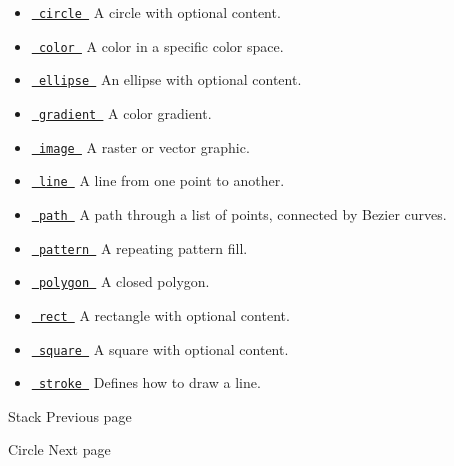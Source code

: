 \begin{itemize}
\tightlist
\item
  \href{/docs/reference/visualize/circle/}{\texttt{\ circle\ }} { A
  circle with optional content. }
\item
  \href{/docs/reference/visualize/color/}{\texttt{\ color\ }} { A color
  in a specific color space. }
\item
  \href{/docs/reference/visualize/ellipse/}{\texttt{\ ellipse\ }} { An
  ellipse with optional content. }
\item
  \href{/docs/reference/visualize/gradient/}{\texttt{\ gradient\ }} { A
  color gradient. }
\item
  \href{/docs/reference/visualize/image/}{\texttt{\ image\ }} { A raster
  or vector graphic. }
\item
  \href{/docs/reference/visualize/line/}{\texttt{\ line\ }} { A line
  from one point to another. }
\item
  \href{/docs/reference/visualize/path/}{\texttt{\ path\ }} { A path
  through a list of points, connected by Bezier curves. }
\item
  \href{/docs/reference/visualize/pattern/}{\texttt{\ pattern\ }} { A
  repeating pattern fill. }
\item
  \href{/docs/reference/visualize/polygon/}{\texttt{\ polygon\ }} { A
  closed polygon. }
\item
  \href{/docs/reference/visualize/rect/}{\texttt{\ rect\ }} { A
  rectangle with optional content. }
\item
  \href{/docs/reference/visualize/square/}{\texttt{\ square\ }} { A
  square with optional content. }
\item
  \href{/docs/reference/visualize/stroke/}{\texttt{\ stroke\ }} {
  Defines how to draw a line. }
\end{itemize}

\href{/docs/reference/layout/stack/}{\pandocbounded{}}

{ Stack } { Previous page }

\href{/docs/reference/visualize/circle/}{\pandocbounded{}}

{ Circle } { Next page }


